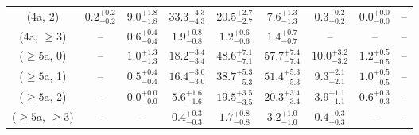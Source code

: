 \begin{table}[h!]
{\begin{tabular}{ccccccccc}
	(4a, 2) & $0.2^{+ 0.2 }_{- 0.2 }$ & $9.0^{+ 1.8 }_{- 1.8 }$ & $33.3^{+ 4.3 }_{- 4.3 }$ & $20.5^{+ 2.7 }_{- 2.7 }$ & $7.6^{+ 1.3 }_{- 1.3 }$ & $0.3^{+ 0.2 }_{- 0.2 }$ & $0.0^{+ 0.0 }_{- 0.0 }$ & -- \\[0.5ex] 
	(4a, $\ge3$) & -- & $0.6^{+ 0.4 }_{- 0.4 }$ & $1.9^{+ 0.8 }_{- 0.8 }$ & $1.2^{+ 0.6 }_{- 0.6 }$ & $1.4^{+ 0.7 }_{- 0.7 }$ & -- & -- & -- \\[0.5ex] 
	($\ge5$a, 0) & -- & $1.0^{+ 1.3 }_{- 1.3 }$ & $18.2^{+ 3.4 }_{- 3.4 }$ & $48.6^{+ 7.1 }_{- 7.1 }$ & $57.7^{+ 7.4 }_{- 7.4 }$ & $10.0^{+ 3.2 }_{- 3.2 }$ & $1.2^{+ 0.5 }_{- 0.5 }$ & -- \\[0.5ex] 
	($\ge5$a, 1) & -- & $0.5^{+ 0.4 }_{- 0.4 }$ & $16.4^{+ 3.0 }_{- 3.0 }$ & $38.7^{+ 5.3 }_{- 5.3 }$ & $51.4^{+ 5.3 }_{- 5.3 }$ & $9.3^{+ 2.1 }_{- 2.1 }$ & $1.0^{+ 0.5 }_{- 0.5 }$ & -- \\[0.5ex] 
	($\ge5$a, 2) & -- & $0.0^{+ 0.0 }_{- 0.0 }$ & $5.6^{+ 1.6 }_{- 1.6 }$ & $19.5^{+ 3.5 }_{- 3.5 }$ & $20.3^{+ 3.4 }_{- 3.4 }$ & $3.9^{+ 1.1 }_{- 1.1 }$ & $0.6^{+ 0.3 }_{- 0.3 }$ & -- \\[0.5ex] 
	($\ge5$a, $\ge3$) & -- & -- & $0.4^{+ 0.3 }_{- 0.3 }$ & $1.7^{+ 0.8 }_{- 0.8 }$ & $3.2^{+ 1.0 }_{- 1.0 }$ & $0.4^{+ 0.3 }_{- 0.3 }$ & -- & -- \\[0.5ex] 
	\hline
	\hline
\end{tabular}}
\end{table}
